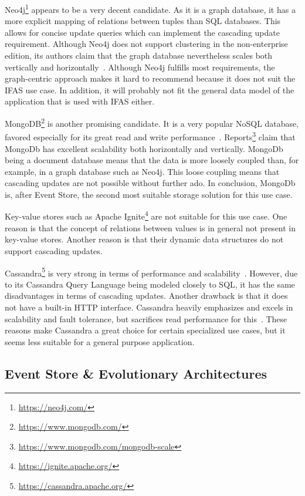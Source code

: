 Neo4j\footnote{\url{https://neo4j.com/}} appears to be a very decent candidate.
As it is a graph database, it has a more explicit mapping of relations between tuples than \ac{SQL} databases.
This allows for concise update queries which can implement the cascading update requirement.
Although Neo4j does not support clustering in the non-enterprise edition, its authors claim that the graph database nevertheless scales both vertically and horizontally~\cite{Neo4jScalability}.
Although Neo4j fulfills most requirements, the graph-centric approach makes it hard to recommend because it does not suit the \ac{IFAS} use case.
In addition, it will probably not fit the general data model of the application that is used with \ac{IFAS} either.

MongoDB\footnote{\url{https://www.mongodb.com/}} is another promising candidate.
It is a very popular NoSQL database, favored especially for its great read and write performance~\cite{6625441}.
Reports\footnote{\url{https://www.mongodb.com/mongodb-scale}} claim that MongoDb has excellent scalability both horizontally and vertically.
MongoDb being a document database means that the data is more loosely coupled than, for example, in a graph database such as Neo4j.
This loose coupling means that cascading updates are not possible without further ado.
In conclusion, MongoDb is, after Event Store, the second most suitable storage solution for this use case.

Key-value stores such as Apache Ignite\footnote{\url{https://ignite.apache.org/}} are not suitable for this use case.
One reason is that the concept of relations between values is in general not present in key-value stores.
Another reason is that their dynamic data structures do not support cascading updates.

Cassandra\footnote{\url{https://cassandra.apache.org/}} is very strong in terms of performance and scalability~\cite{lakshman2009cassandra}.
However, due to its Cassandra Query Language being modeled closely to \ac{SQL}, it has the same disadvantages in terms of cascading updates.
Another drawback is that it does not have a built-in HTTP interface.
Cassandra heavily emphasizes and excels in scalability and fault tolerance, but sacrifices read performance for this~\cite{6625441}.
These reasons make Cassandra a great choice for certain specialized use cases, but it seems less suitable for a general purpose application.

\subsection{Event Store \& Evolutionary Architectures}

